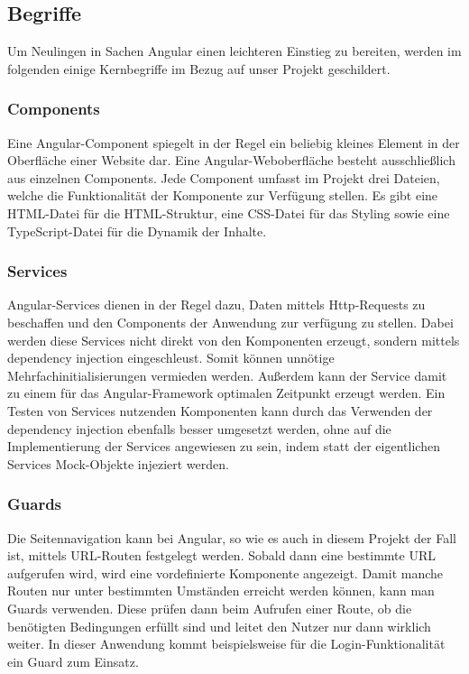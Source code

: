\subsection{Begriffe}
Um Neulingen in Sachen Angular einen leichteren Einstieg zu bereiten, werden im folgenden einige Kernbegriffe im Bezug auf unser Projekt geschildert.

\subsubsection{Components}
Eine Angular-Component spiegelt in der Regel ein beliebig kleines Element in der Oberfläche einer Website dar. Eine Angular-Weboberfläche besteht ausschließlich aus einzelnen Components. Jede Component umfasst im Projekt drei Dateien, welche die Funktionalität der Komponente zur Verfügung stellen. Es gibt eine \acs{HTML}-Datei für die \acs{HTML}-Struktur, eine \acs{CSS}-Datei für das Styling sowie eine TypeScript-Datei für die Dynamik der Inhalte.

\subsubsection{Services}
Angular-Services dienen in der Regel dazu, Daten mittels Http-Requests zu beschaffen und den Components der Anwendung zur verfügung zu stellen. Dabei werden diese Services nicht direkt von den Komponenten erzeugt, sondern mittels dependency injection eingeschleust. Somit können unnötige Mehrfachinitialisierungen vermieden werden. Außerdem kann der Service damit zu einem für das Angular-Framework optimalen Zeitpunkt erzeugt werden. Ein Testen von Services nutzenden Komponenten kann durch das Verwenden der dependency injection ebenfalls besser umgesetzt werden, ohne auf die Implementierung der Services angewiesen zu sein, indem statt der eigentlichen Services Mock-Objekte injeziert werden.

\subsubsection{Guards}
Die Seitennavigation kann bei Angular, so wie es auch in diesem Projekt der Fall ist, mittels \acs{URL}-Routen festgelegt werden. Sobald dann eine bestimmte \acs{URL} aufgerufen wird, wird eine vordefinierte Komponente angezeigt. Damit manche Routen nur unter bestimmten Umständen erreicht werden können, kann man Guards verwenden. Diese prüfen dann beim Aufrufen einer Route, ob die benötigten Bedingungen erfüllt sind und leitet den Nutzer nur dann wirklich weiter. In dieser Anwendung kommt beispielsweise für die Login-Funktionalität ein Guard zum Einsatz.

